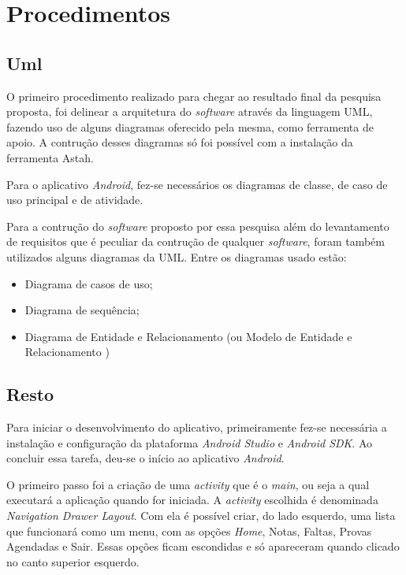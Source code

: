 \section{Procedimentos}
	
	\subsection{Uml}
	
			\par O primeiro procedimento realizado para chegar ao resultado final 
		da pesquisa proposta, foi delinear a arquitetura do \textit{software} através
		da linguagem UML, fazendo uso de alguns diagramas oferecido pela mesma, como
		ferramenta de apoio. A contrução desses diagramas só foi possível com a
		instalação da ferramenta Astah.
			
			\par Para o aplicativo \textit{Android}, fez-se necessários os diagramas de
		classe, de caso de uso principal e de atividade.
		
			\par Para a contrução do \textit{software} proposto por essa pesquisa além do
		levantamento de requisitos que é peculiar da contrução de qualquer
		\textit{software}, foram também utilizados alguns diagramas da UML. Entre os
		diagramas usado estão:
			\begin{itemize}
			  
			  \item Diagrama de casos de uso;
			  
			  \item Diagrama de sequência;
			  
			  \item Diagrama de Entidade e Relacionamento (ou Modelo de Entidade e
			  Relacionamento )
			
			\end{itemize}
	
	
	\subsection{Resto}
	
		\par Para iniciar o desenvolvimento do aplicativo, primeiramente fez-se
	necessária a instalação e configuração da plataforma \textit{Android Studio} e
	\textit{Android SDK}. Ao concluir essa tarefa, deu-se o início ao aplicativo
	\textit{Android}.

		\par O primeiro passo foi a criação de uma \textit{activity} que é o
	\textit{main}, ou seja a qual executará a aplicação quando for iniciada.
	A \textit{activity} escolhida é denominada \textit{Navigation Drawer Layout}.
	Com ela é possível criar, do lado esquerdo, uma lista que funcionará como um
	menu, com as opções \textit{Home}, Notas, Faltas, Provas Agendadas e Sair.
	Essas opções ficam escondidas e só apareceram quando clicado no canto superior
	esquerdo.

